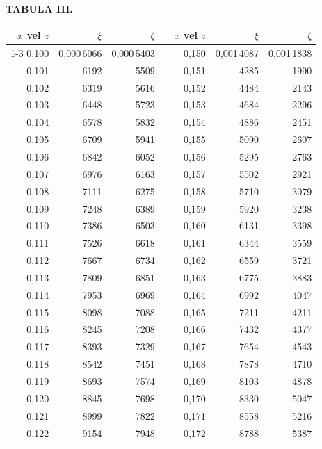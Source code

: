 \endgroup
\clearpage
{}
\begingroup
\centering
\fontsize{9}{9}\selectfont
\setlength{\tabcolsep}{8pt}
\renewcommand{\arraystretch}{1}
\setlength{\parskip}{0pt}
\textbf{TABULA III.}
\par\vspace{7pt}
\begin{tabular}{|r|r|r|@{}p{9pt}@{}|r|r|r|}
\hline
\(x\) vel \(z\) & \(\xi\) & \(\zeta\) & & \(x\) vel \(z\) & \(\xi\) & \(\zeta\) \\
\cline{1-3}\cline{5-7}
0,100 & 0,000\,6066 & 0,000\,5403 &  & 0,150 & 0,001\,4087 & 0,001\,1838 \\
0,101 & 6192 & 5509 &  & 0,151 & 4285 & 1990 \\
0,102 & 6319 & 5616 &  & 0,152 & 4484 & 2143 \\
0,103 & 6448 & 5723 &  & 0,153 & 4684 & 2296 \\
0,104 & 6578 & 5832 &  & 0,154 & 4886 & 2451 \\
0,105 & 6709 & 5941 &  & 0,155 & 5090 & 2607 \\[3pt]
0,106 & 6842 & 6052 &  & 0,156 & 5295 & 2763 \\
0,107 & 6976 & 6163 &  & 0,157 & 5502 & 2921 \\
0,108 & 7111 & 6275 &  & 0,158 & 5710 & 3079 \\
0,109 & 7248 & 6389 &  & 0,159 & 5920 & 3238 \\
0,110 & 7386 & 6503 &  & 0,160 & 6131 & 3398 \\[3pt]
0,111 & 7526 & 6618 &  & 0,161 & 6344 & 3559 \\
0,112 & 7667 & 6734 &  & 0,162 & 6559 & 3721 \\
0,113 & 7809 & 6851 &  & 0,163 & 6775 & 3883 \\
0,114 & 7953 & 6969 &  & 0,164 & 6992 & 4047 \\
0,115 & 8098 & 7088 &  & 0,165 & 7211 & 4211 \\[3pt]
0,116 & 8245 & 7208 &  & 0,166 & 7432 & 4377 \\
0,117 & 8393 & 7329 &  & 0,167 & 7654 & 4543 \\
0,118 & 8542 & 7451 &  & 0,168 & 7878 & 4710 \\
0,119 & 8693 & 7574 &  & 0,169 & 8103 & 4878 \\
0,120 & 8845 & 7698 &  & 0,170 & 8330 & 5047 \\[3pt]
0,121 & 8999 & 7822 &  & 0,171 & 8558 & 5216 \\
0,122 & 9154 & 7948 &  & 0,172 & 8788 & 5387 \\

\end{tabular}
